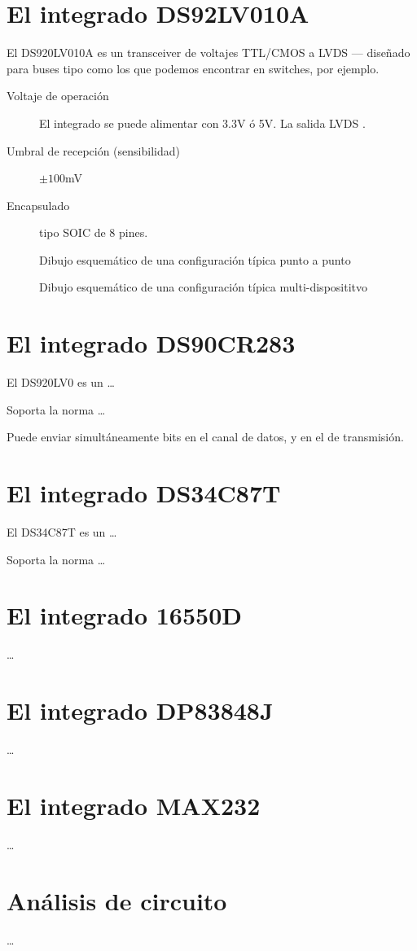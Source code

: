 \documentclass[a4paper]{article}
\begin{document}
%
\sffamily
%
\maketitle
%
% 
\section{El integrado DS92LV010A}
%
El DS920LV010A es un transceiver de voltajes TTL/CMOS a LVDS --- 
diseñado para buses tipo  como los que podemos encontrar en switches, por ejemplo.
%
\begin{description}
\item[Voltaje de operación] El integrado se puede alimentar con 3.3V ó 5V. La salida LVDS .
\item[Umbral de recepción (sensibilidad)] $\pm 100$mV
\item[Encapsulado] tipo SOIC de 8 pines.
\end{description}
%
\begin{figure}[h]
\caption{Dibujo esquemático de una configuración típica punto a punto}
\end{figure}
%
\begin{figure}[h]
\caption{Dibujo esquemático de una configuración típica multi-disposititvo}
\end{figure}
%
\section{El integrado DS90CR283}
%
El DS920LV0 es un \ldots

Soporta la norma \ldots

Puede enviar simultáneamente  bits en el canal de datos, y  en el de transmisión.
%
\section{El integrado DS34C87T}
%
El DS34C87T es un \ldots

Soporta la norma \ldots
%
\section{El integrado 16550D}
%
\ldots
%
\section{El integrado DP83848J}
%
\ldots
%
\section{El integrado MAX232}
%
\ldots
%
\section{Análisis de circuito}
%
\ldots
%
\end{document}
